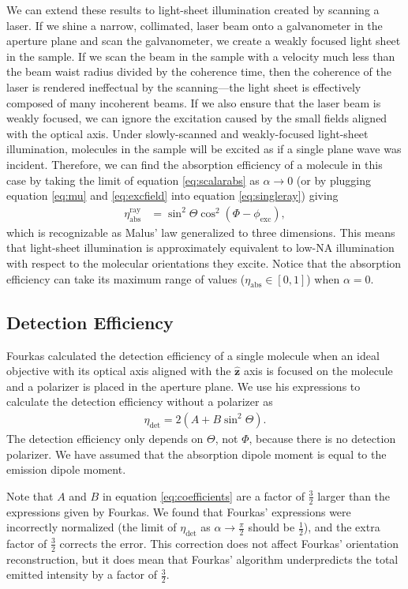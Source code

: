 \documentclass[10pt]{article}
\providecommand{\mh}[1]{\mathbf{\hat{#1}}}
\begin{document}
We can extend these results to light-sheet illumination created by scanning a
laser. If we shine a narrow, collimated, laser beam onto a galvanometer in the
aperture plane and scan the galvanometer, we create a weakly focused light sheet
in the sample. If we scan the beam in the sample with a velocity much less than
the beam waist radius divided by the coherence time, then the coherence of the
laser is rendered ineffectual by the scanning---the light sheet is effectively
composed of many incoherent beams. If we also ensure that the laser beam is
weakly focused, we can ignore the excitation caused by the small fields aligned
with the optical axis. Under slowly-scanned and weakly-focused light-sheet
illumination, molecules in the sample will be excited as if a single plane wave
was incident. Therefore, we can find the absorption efficiency of a molecule in
this case by taking the limit of equation \ref{eq:scalarabs} as
$\alpha \rightarrow 0$ (or by plugging equation \ref{eq:mu} and
\ref{eq:excfield} into equation \ref{eq:singleray}) giving
\begin{align}
  \eta_{\text{abs}}^{\text{ray}} &= \sin^2\Theta\cos^2(\Phi - \phi_{\text{exc}}),
\end{align}
which is recognizable as Malus' law generalized to three dimensions. This means
that light-sheet illumination is approximately equivalent to low-NA illumination
with respect to the molecular orientations they excite. Notice that the
absorption efficiency can take its maximum range of values
($\eta_{\text{abs}} \in [0, 1]$) when $\alpha=0$.

\subsection{Detection Efficiency}\label{detection}
Fourkas calculated the detection efficiency of a single molecule when an ideal
objective with its optical axis aligned with the $\mh{z}$ axis is focused on the
molecule and a polarizer is placed in the aperture plane\cite{fourkas2001}. We
use his expressions to calculate the detection efficiency without a polarizer as
\begin{align}
  \eta_{\text{det}} = 2(A + B\sin^2\Theta). \label{eq:scalardet}
\end{align}
The detection efficiency only depends on $\Theta$, not $\Phi$, because there is
no detection polarizer. We have assumed that the absorption dipole moment is
equal to the emission dipole moment.

Note that $A$ and $B$ in equation \ref{eq:coefficients} are a factor of
$\frac{3}{2}$ larger than the expressions given by Fourkas. We found that
Fourkas' expressions were incorrectly normalized (the limit of
$\eta_{\text{det}}$ as $\alpha\rightarrow \frac{\pi}{2}$ should be $\frac{1}{2}$), and
the extra factor of $\frac{3}{2}$ corrects the error. This correction does not
affect Fourkas' orientation reconstruction, but it does mean that Fourkas'
algorithm underpredicts the total emitted intensity by a factor of
$\frac{3}{2}$.
\end{document}
